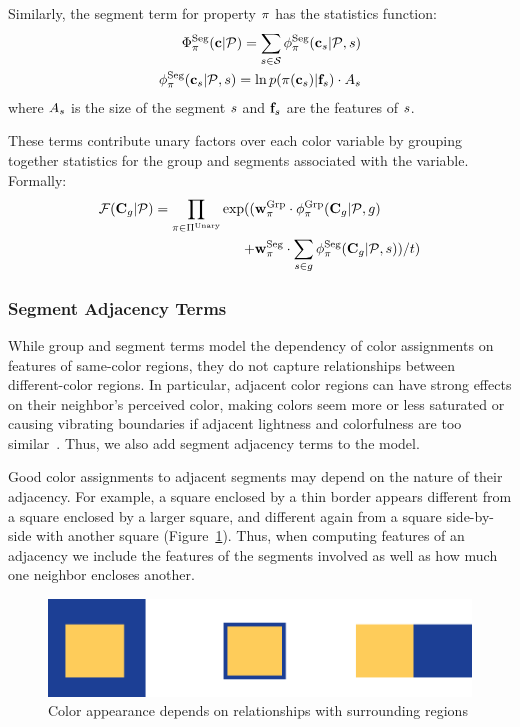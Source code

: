 Similarly, the segment term for property $\pi$ has the statistics function:
\begin{align*}
 \Phi^{\textrm{Seg}}_\pi(\mathbf{c}|\mathcal{P}) = \sum_{s \in \mathcal{S}} \phi^{\textrm{Seg}}_\pi(\mathbf{c}_s | \mathcal{P}, s) \\
 \phi^{\textrm{Seg}}_\pi(\mathbf{c}_s | \mathcal{P}, s) = \ln p( \pi( \mathbf{c}_s ) | \mathbf{f}_s) \cdot A_s
\end{align*}
where $A_s$ is the size of the segment $s$ and $\mathbf{f}_s$ are the features of $s$.

These terms contribute unary factors over each color variable by grouping together statistics for the group and segments associated with the variable. Formally:
\begin{align*}
 \mathcal{F}(\mathbf{C}_g | \mathcal{P}) = \prod_{\pi \in \Pi^{\textrm{Unary}}}
 		\exp( (&\mathbf{w}^{\textrm{Grp}}_\pi \cdot \phi^{\textrm{Grp}}_\pi(\mathbf{C}_g | \mathcal{P}, g)  \\
 		     + &\mathbf{w}^{\textrm{Seg}}_\pi \cdot \sum_{s \in g} \phi^{\textrm{Seg}}_\pi(\mathbf{C}_g | \mathcal{P}, s)) / t) 
\end{align*}


\subsubsection{Segment Adjacency Terms}
\label{sec:adjTerms}

While group and segment terms model the dependency of color assignments on features of same-color regions, they do not capture relationships between different-color regions. In particular, adjacent color regions can have strong effects on their neighbor's perceived color, making colors seem more or less saturated or causing vibrating boundaries if adjacent lightness and colorfulness are too similar~\cite{AlbersInteractionOfColor}. Thus, we also add segment adjacency terms to the model.

Good color assignments to adjacent segments may depend on the nature of their adjacency. For example, a square enclosed by a thin border appears different from a square enclosed by a larger square, and different again from a square side-by-side with another square (Figure~\ref{fig:surround}). Thus, when computing features of an adjacency we include the features of the segments involved as well as how much one neighbor encloses another.
\begin{figure}[ht]
\centering
\includegraphics[width=.7\columnwidth]{figs/surround}
\caption{Color appearance depends on relationships with surrounding regions}
\label{fig:surround}
\end{figure}



